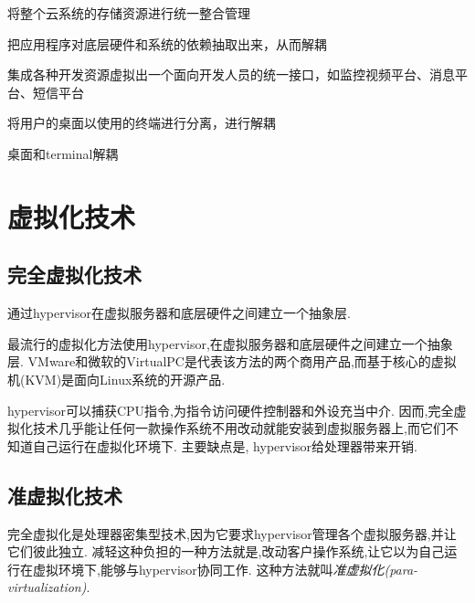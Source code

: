 \begin{definition}[存储虚拟化]
    将整个云系统的存储资源进行统一整合管理
\end{definition}

\begin{definition}[应用程序虚拟化]
    把应用程序对底层硬件和系统的依赖抽取出来，从而解耦
\end{definition}

\begin{definition}[平台虚拟化]
    集成各种开发资源虚拟出一个面向开发人员的统一接口，如监控视频平台、消息平台、短信平台
\end{definition}

\begin{definition}[桌面虚拟化]
    将用户的桌面以使用的终端进行分离，进行解耦

    桌面和terminal解耦
\end{definition}

\section{虚拟化技术}


\subsection{完全虚拟化技术}

\begin{definition}[完全虚拟化技术]
    通过hypervisor在虚拟服务器和底层硬件之间建立一个抽象层. 
\end{definition}

最流行的虚拟化方法使用hypervisor,在虚拟服务器和底层硬件之间建立一个抽象层. VMware和微软的VirtualPC是代表该方法的两个商用产品,而基于核心的虚拟机(KVM)是面向Linux系统的开源产品. 

hypervisor可以捕获CPU指令,为指令访问硬件控制器和外设充当中介. 因而,完全虚拟化技术几乎能让任何一款操作系统不用改动就能安装到虚拟服务器上,而它们不知道自己运行在虚拟化环境下. 主要缺点是, hypervisor给处理器带来开销. 


\subsection{准虚拟化技术}

\begin{definition}[准虚拟化技术]
    完全虚拟化是处理器密集型技术,因为它要求hypervisor管理各个虚拟服务器,并让它们彼此独立. 减轻这种负担的一种方法就是,改动客户操作系统,让它以为自己运行在虚拟环境下,能够与hypervisor协同工作. 这种方法就叫\textit{准虚拟化(para-virtualization)}. 
\end{definition}

